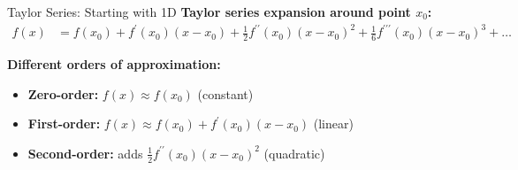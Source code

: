 \documentclass[usenames,dvipsnames]{beamer}
\begin{document}
  \begin{frame}{Taylor Series: Starting with 1D}
    \textbf{Taylor series expansion around point $x_0$:}
    \begin{align}
        f(x) &= f(x_0) + f^{\prime}(x_0)(x-x_0) + \frac{1}{2}f^{\prime\prime}(x_0)(x-x_0)^2 + \frac{1}{6}f^{\prime\prime\prime}(x_0)(x-x_0)^3 + \ldots
    \end{align}
    
    \pause
    \textbf{Different orders of approximation:}
    \begin{itemize}[<+->]
        \item \textbf{Zero-order:} $f(x) \approx f(x_0)$ (constant)
        \item \textbf{First-order:} $f(x) \approx f(x_0) + f^{\prime}(x_0)(x-x_0)$ (linear)
        \item \textbf{Second-order:} adds $\frac{1}{2}f^{\prime\prime}(x_0)(x-x_0)^2$ (quadratic)
    \end{itemize}
  \end{frame}
\end{document}
